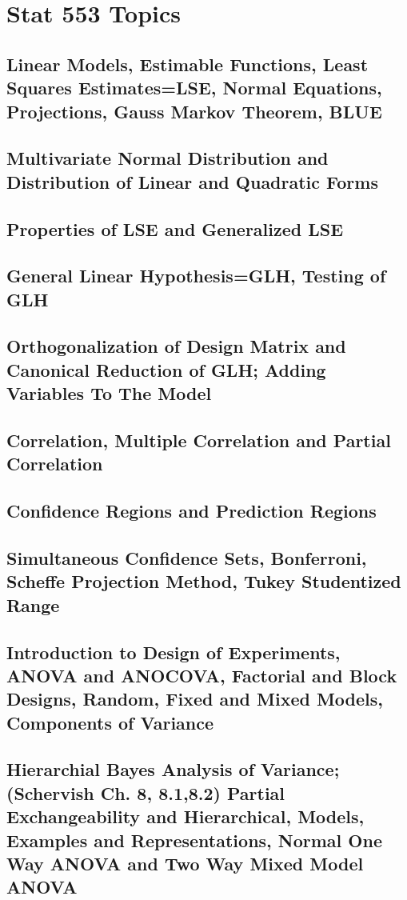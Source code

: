 \documentclass{report}
\begin{document}
\part{Stat 553 Topics}
\chapter{Linear Models, Estimable Functions, Least Squares Estimates=LSE, Normal Equations, Projections, Gauss Markov Theorem, BLUE}
\chapter{Multivariate Normal Distribution and Distribution of Linear and Quadratic Forms}
\chapter{Properties of LSE and Generalized LSE}
\chapter{General Linear Hypothesis=GLH, Testing of GLH}
\chapter{Orthogonalization of Design Matrix and Canonical Reduction of GLH;  Adding Variables To The Model}
\chapter{Correlation, Multiple Correlation and  Partial Correlation}
\chapter{Confidence Regions and Prediction Regions}
\chapter{Simultaneous Confidence Sets, Bonferroni, Scheffe Projection Method, Tukey Studentized Range}
\chapter{Introduction to Design of Experiments, ANOVA and ANOCOVA, Factorial and Block Designs, Random, Fixed and Mixed Models, Components of Variance}
\chapter{Hierarchial Bayes Analysis of Variance; (Schervish Ch. 8, 8.1,8.2) Partial Exchangeability and Hierarchical, Models, Examples and Representations, Normal One Way ANOVA and Two Way Mixed Model ANOVA}
\end{document}
